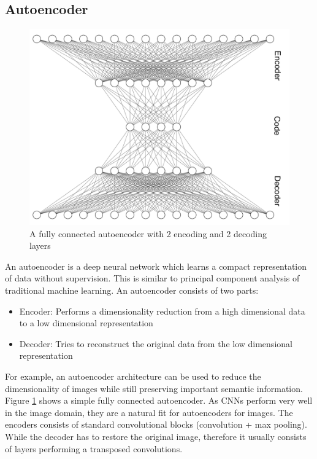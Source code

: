 \documentclass[draft,final,oneside]{vutinfth} %
\begin{document}
\subsection{Autoencoder}

\begin{figure}[ht]
	\centering
  	\includegraphics[width=1.0\textwidth]{graphics/autoencoder.png}
	\caption{A fully connected autoencoder with 2 encoding and 2 decoding layers}
	\label{fig:autoencoder}
\end{figure}

An autoencoder is a deep neural network which learns a compact representation of data without supervision. This is similar to principal component analysis of traditional machine learning. An autoencoder consists of two parts: 

\begin{itemize}
\item Encoder: Performs a dimensionality reduction from a high dimensional data to a low dimensional representation
\item Decoder: Tries to reconstruct the original data from the low dimensional representation
\end{itemize}

For example, an autoencoder architecture can be used to reduce the dimensionality of images while still preserving important semantic information. Figure \ref{fig:autoencoder} shows a simple fully connected autoencoder. As CNNs perform very well in the image domain, they are a natural fit for autoencoders for images. The encoders consists of standard convolutional blocks (convolution + max pooling). While the decoder has to restore the original image, therefore it usually consists of layers performing a transposed convolutions.
\end{document}
